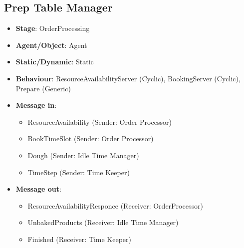 \documentclass[12pt]{article}
\begin{document}
\subsection{Prep Table Manager}%
\label{sub:prep_manager}
\begin{itemize}
    \item \textbf{Stage}: OrderProcessing
    \item \textbf{Agent/Object}: Agent
    \item \textbf{Static/Dynamic}: Static
    \item \textbf{Behaviour}: ResourceAvailabilityServer (Cyclic), BookingServer (Cyclic), Prepare (Generic)
    \item \textbf{Message in}:
        \begin{itemize}
            \item ResourceAvailability (Sender: Order Processor)
            \item BookTimeSlot (Sender: Order Processor)
            \item Dough (Sender: Idle Time Manager)
            \item TimeStep (Sender: Time Keeper)
        \end{itemize}
    \item \textbf{Message out}:
        \begin{itemize}
            \item ResourceAvailabilityResponce (Receiver: OrderProcessor)
            \item UnbakedProducts (Receiver: Idle Time Manager)
            \item Finished (Receiver: Time Keeper)
        \end{itemize}
\end{itemize}
\end{document}
